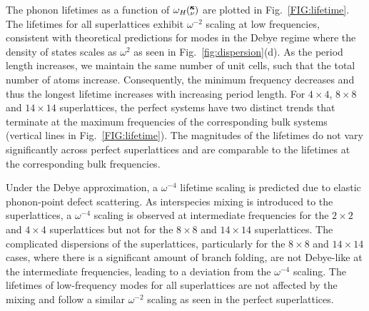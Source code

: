 \documentclass[aps,prb,preprint,preprintnumbers,amsmath,amssymb,floatfix,superscriptaddress]{revtex4}
\newcommand{\kv}{\mspace{-4.0mu}\left(\mspace{-8.0mu}
\begin{smallmatrix}&\pmb{\kappa} \\&\nu\end{smallmatrix}
\mspace{-3.0mu}\right)}
\begin{document}
The phonon lifetimes as a function of $\omega_H \kv$ are plotted in Fig.~\ref{FIG:lifetime}. The lifetimes for all superlattices exhibit $\omega^{-2}$ scaling at low frequencies, consistent with theoretical predictions for modes in the Debye regime where the density of states scales as $\omega^{2}$ as seen in Fig.~\ref{fig:dispersion}(d).\cite{Klemens_Thermal_1951} As the period length increases, we maintain the same number of unit cells, such that the total number of atoms increase. Consequently, the minimum frequency decreases and thus the longest lifetime increases with increasing period length. For $4\times4$, $8\times8$ and $14\times14$ superlattices, the perfect systems have two distinct trends that terminate at the maximum frequencies of the corresponding bulk systems (vertical lines in Fig.~\ref{FIG:lifetime}). The magnitudes of the lifetimes do not vary significantly across perfect superlattices and are comparable to the lifetimes at the corresponding bulk frequencies.

Under the Debye approximation, a $\omega^{-4}$ lifetime scaling is predicted due to elastic phonon-point defect scattering.\cite{PhysRev.140.A1812,klemens_scattering_1955-3, klemens_thermal_1957-2} As interspecies mixing is introduced to the superlattices, a $\omega^{-4}$ scaling is observed at intermediate frequencies for the $2\times2$ and $4\times4$ superlattices but not for the $8\times8$ and $14\times14$ superlattices. The complicated dispersions of the superlattices, particularly for the $8\times8$ and $14\times14$ cases, where there is a significant amount of branch folding, are not Debye-like at the intermediate frequencies, leading to a deviation from the $\omega^{-4}$ scaling. The lifetimes of low-frequency modes for all superlattices are not affected by the mixing and follow a similar $\omega^{-2}$ scaling as seen in the perfect superlattices.
\end{document}

